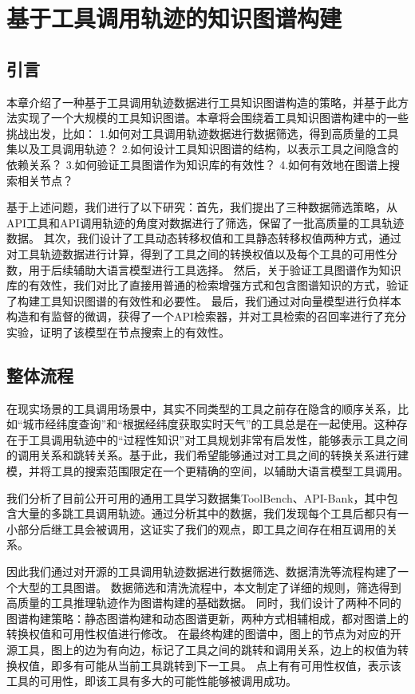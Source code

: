 
\chapter{基于工具调用轨迹的知识图谱构建}

\section{引言}

本章介绍了一种基于工具调用轨迹数据进行工具知识图谱构造的策略，并基于此方法实现了一个大规模的工具知识图谱。本章将会围绕着工具知识图谱构建中的一些挑战出发，比如：
1.如何对工具调用轨迹数据进行数据筛选，得到高质量的工具集以及工具调用轨迹？
2.如何设计工具知识图谱的结构，以表示工具之间隐含的依赖关系？
3.如何验证工具图谱作为知识库的有效性？
4.如何有效地在图谱上搜索相关节点？

基于上述问题，我们进行了以下研究：首先，我们提出了三种数据筛选策略，从API工具和API调用轨迹的角度对数据进行了筛选，保留了一批高质量的工具轨迹数据。
其次，我们设计了工具动态转移权值和工具静态转移权值两种方式，通过对工具轨迹数据进行计算，得到了工具之间的转换权值以及每个工具的可用性分数，用于后续辅助大语言模型进行工具选择。
然后，关于验证工具图谱作为知识库的有效性，我们对比了直接用普通的检索增强方式和包含图谱知识的方式，验证了构建工具知识图谱的有效性和必要性。
最后，我们通过对向量模型进行负样本构造和有监督的微调，获得了一个API检索器，并对工具检索的召回率进行了充分实验，证明了该模型在节点搜索上的有效性。

\section{整体流程}

在现实场景的工具调用场景中，其实不同类型的工具之前存在隐含的顺序关系，比如“城市经纬度查询”和“根据经纬度获取实时天气”的工具总是在一起使用。这种存在于工具调用轨迹中的“过程性知识”对工具规划非常有启发性，能够表示工具之间的调用关系和跳转关系。基于此，我们希望能够通过对工具之间的转换关系进行建模，并将工具的搜索范围限定在一个更精确的空间，以辅助大语言模型工具调用。

我们分析了目前公开可用的通用工具学习数据集ToolBench、API-Bank，其中包含大量的多跳工具调用轨迹。通过分析其中的数据，我们发现每个工具后都只有一小部分后继工具会被调用，这证实了我们的观点，即工具之间存在相互调用的关系。

因此我们通过对开源的工具调用轨迹数据进行数据筛选、数据清洗等流程构建了一个大型的工具图谱。
数据筛选和清洗流程中，本文制定了详细的规则，筛选得到高质量的工具推理轨迹作为图谱构建的基础数据。
同时，我们设计了两种不同的图谱构建策略：静态图谱构建和动态图谱更新，两种方式相辅相成，都对图谱上的转换权值和可用性权值进行修改。
在最终构建的图谱中，图上的节点为对应的开源工具，图上的边为有向边，标记了工具之间的跳转和调用关系，边上的权值为转换权值，即多有可能从当前工具跳转到下一工具。
点上有有可用性权值，表示该工具的可用性，即该工具有多大的可能性能够被调用成功。

